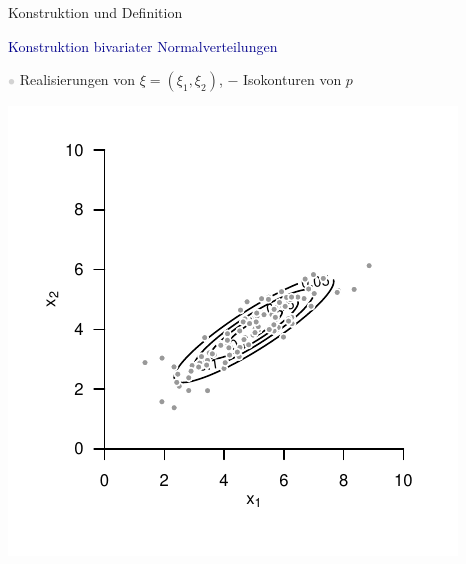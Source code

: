 \documentclass[
  8pt,
  ignorenonframetext,
]{beamer}
\begin{document}
\begin{frame}{Konstruktion und Definition}
\protect\hypertarget{konstruktion-und-definition-4}{}
\vspace{2mm}

\textcolor{darkblue}{Konstruktion bivariater Normalverteilungen}

\center
\small

\textcolor{lightgray}{$\bullet$} Realisierungen von
\(\xi = (\xi_1,\xi_2)\), \(-\) Isokonturen von \(p\) \vspace{2mm}

\begin{center}\includegraphics[width=0.55\linewidth]{6_Abbildungen/mvda_6_konstruktion} \end{center}
\end{frame}
\end{document}
